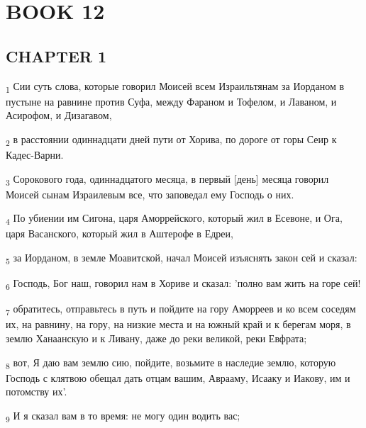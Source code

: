 \section{BOOK 12}
\subsection{CHAPTER 1}
\begin{tcolorbox}
\textsubscript{1} Сии суть слова, которые говорил Моисей всем Израильтянам за Иорданом в пустыне на равнине против Суфа, между Фараном и Тофелом, и Лаваном, и Асирофом, и Дизагавом,
\end{tcolorbox}
\begin{tcolorbox}
\textsubscript{2} в расстоянии одиннадцати дней пути от Хорива, по дороге от горы Сеир к Кадес-Варни.
\end{tcolorbox}
\begin{tcolorbox}
\textsubscript{3} Сорокового года, одиннадцатого месяца, в первый [день] месяца говорил Моисей сынам Израилевым все, что заповедал ему Господь о них.
\end{tcolorbox}
\begin{tcolorbox}
\textsubscript{4} По убиении им Сигона, царя Аморрейского, который жил в Есевоне, и Ога, царя Васанского, который жил в Аштерофе в Едреи,
\end{tcolorbox}
\begin{tcolorbox}
\textsubscript{5} за Иорданом, в земле Моавитской, начал Моисей изъяснять закон сей и сказал:
\end{tcolorbox}
\begin{tcolorbox}
\textsubscript{6} Господь, Бог наш, говорил нам в Хориве и сказал: 'полно вам жить на горе сей!
\end{tcolorbox}
\begin{tcolorbox}
\textsubscript{7} обратитесь, отправьтесь в путь и пойдите на гору Аморреев и ко всем соседям их, на равнину, на гору, на низкие места и на южный край и к берегам моря, в землю Ханаанскую и к Ливану, даже до реки великой, реки Евфрата;
\end{tcolorbox}
\begin{tcolorbox}
\textsubscript{8} вот, Я даю вам землю сию, пойдите, возьмите в наследие землю, которую Господь с клятвою обещал дать отцам вашим, Аврааму, Исааку и Иакову, им и потомству их'.
\end{tcolorbox}
\begin{tcolorbox}
\textsubscript{9} И я сказал вам в то время: не могу один водить вас;
\end{tcolorbox}
